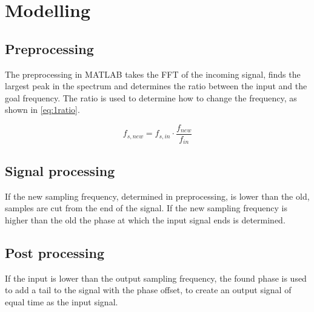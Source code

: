 
\section{Modelling}
\label{sec:PureSineModelling}
\subsection{Preprocessing}
The preprocessing in MATLAB takes the FFT of the incoming signal, finds the largest peak in the spectrum and determines the ratio between the input and the goal frequency.
The ratio is used to determine how to change the frequency, as shown in \cref{eq:1ratio}.

\begin{equation}
	f_{s,new} = f_{s,in}\cdot\frac{f_{new}}{f_{in}}
	\label{eq:1ratio}
\end{equation}

\subsection{Signal processing}
If the new sampling frequency, determined in preprocessing, is lower than the old, samples are cut from the end of the signal. 
If the new sampling frequency is higher than the old the phase at which the input signal ends is determined.

\subsection{Post processing}
If the input is lower than the output sampling frequency, the found phase is used to add a tail to the signal with the phase offset, to create an output signal of equal time as the input signal.

\FloatBarrier